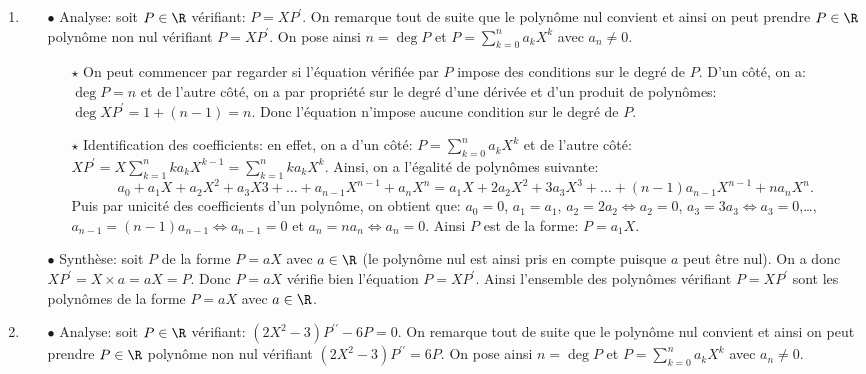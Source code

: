 \documentclass[a4paper, 11pt,reqno]{article}
\begin{document}
\begin{correction}  \;
	\begin{enumerate}
		\item
		      \begin{itemize}
			      \item[$\bullet$] Analyse: soit $P\in\R$ v\'erifiant: $P=XP^{\prime}$. On remarque tout de suite que le polyn\^{o}me nul convient et ainsi on peut prendre $P\in\R$ polyn\^{o}me non nul v\'erifiant $P=XP^{\prime}$. On pose ainsi $n=\deg{P}$ et $P=\sum\limits_{k=0}^n a_k X^k$ avec $a_n\not= 0$.
			            \begin{itemize}
				            \item[$\star$] On peut commencer par regarder si l'\'equation v\'erifi\'ee par $P$ impose des conditions sur le degr\'e de $P$. D'un c\^{o}t\'e, on a: $\deg{P}=n$ et de l'autre c\^{o}t\'e, on a par propri\'et\'e sur le degr\'e d'une d\'eriv\'ee et d'un produit de polyn\^{o}mes: $\deg{XP^{\prime}}=1+(n-1)=n$. Donc l'\'equation n'impose aucune condition sur le degr\'e de $P$.
				            \item[$\star$] Identification des coefficients: en effet, on a d'un c\^{o}t\'e: $P=\sum\limits_{k=0}^n  a_k X^k$ et de l'autre c\^{o}t\'e: $XP^{\prime}=X\sum\limits_{k=1}^n ka_k X^{k-1}=\sum\limits_{k=1}^n  ka_k X^k$. Ainsi, on a l'\'egalit\'e de polyn\^{o}mes suivante:
				                  $$a_0+a_1X+a_2X^2+a_3X3+\dots+a_{n-1}X^{n-1}+a_nX^n=a_1X+2a_2X^2+3a_3X^3+\dots+(n-1)a_{n-1}X^{n-1}+na_nX^n.$$
				                  Puis par unicit\'e des coefficients d'un polyn\^{o}me, on obtient que: $a_0=0$, $a_1=a_1$, $a_2=2a_2\Leftrightarrow a_2=0$, $a_3=3a_3\Leftrightarrow a_3=0$,\dots, $a_{n-1}=(n-1)a_{n-1}\Leftrightarrow a_{n-1}=0$ et $a_{n}=na_{n}\Leftrightarrow a_{n}=0$. Ainsi $P$ est de la forme: $P=a_1X$.
			            \end{itemize}
			      \item[$\bullet$] Synth\`{e}se: soit $P$ de la forme $P=aX$ avec $a\in\R$ (le polyn\^{o}me nul est ainsi pris en compte puisque $a$ peut \^{e}tre nul). On a donc $XP^{\prime}=X\times a=aX=P$. Donc $P=aX$ v\'erifie bien l'\'equation $P=XP^{\prime}$. Ainsi l'ensemble des polyn\^{o}mes v\'erifiant $P=XP^{\prime}$ sont les polyn\^{o}mes de la forme $P=aX$ avec $a\in\R$.
		      \end{itemize}
		\item
		      \begin{itemize}
			      \item[$\bullet$] Analyse: soit $P\in\R$ v\'erifiant: $(2X^2-3)P^{\prime\prime}-6P=0$. On remarque tout de suite que le polyn\^{o}me nul convient et ainsi on peut prendre $P\in\R$ polyn\^{o}me non nul v\'erifiant $(2X^2-3)P^{\prime\prime}=6P$. On pose ainsi $n=\deg{P}$ et $P=\sum\limits_{k=0}^n a_k X^k$ avec $a_n\not= 0$.

\end{itemize}
\end{enumerate}
\end{correction}
\end{document}
